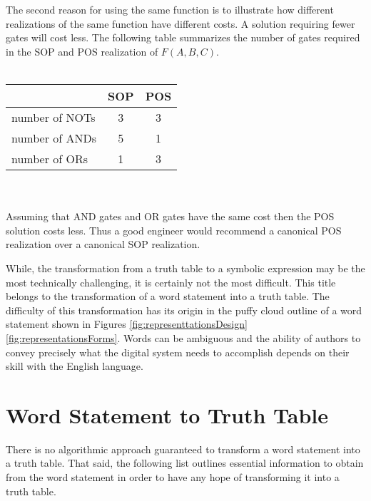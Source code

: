 The second reason for using the same function is to illustrate
how different realizations of the same function have different costs.
A solution requiring fewer gates
will cost less.  The following table summarizes the number of gates 
required in the SOP and POS realization of $F(A,B,C)$.
\\ \\
\begin{tabular}[ht]{l|c|c}
		    & SOP 	& POS	\\ \hline
 number of NOTs & 3	& 3	\\ \hline
 number of ANDs & 5	& 1	\\ \hline
 number of ORs  & 1	& 3	\\ 
\end{tabular}
\\ \\
Assuming that AND gates and OR gates have the same cost then the POS 
solution costs less.  Thus a good engineer would recommend a 
canonical POS realization over a canonical SOP realization.

While, the transformation from a truth table to a symbolic expression
may be the most technically challenging, it is certainly not the
most difficult.  This title belongs to the transformation of a word
statement into a truth table.  The difficulty of this transformation
has its origin in the puffy cloud outline of a word statement shown in
Figures \ref{fig:representtationsDesign} \ref{fig:representationsForms}. Words can be ambiguous and 
the ability of authors to convey precisely what the digital system
needs to accomplish depends on their skill with the English language.

\section{Word Statement to Truth Table}
There is no algorithmic approach guaranteed to transform a word statement 
into a truth table.  That said, the following list outlines essential
information to obtain from the word statement in order to
have any hope of transforming it into a truth table.



